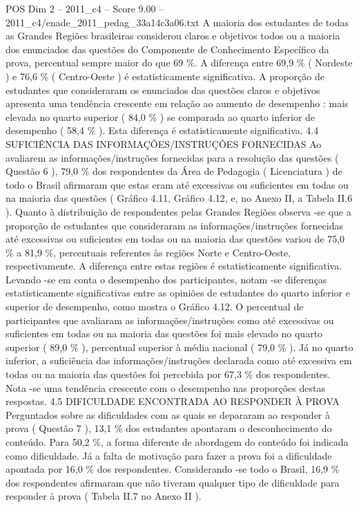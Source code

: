 \begin{textsample}{POS Dim 2 – 2011\_c4 – Score 9.00 – 2011\_c4/enade\_2011\_pedag\_33a14c3a06.txt}
A maioria dos estudantes de todas as Grandes Regiões brasileiras considerou claros e objetivos todos ou a maioria dos enunciados das questões do Componente de Conhecimento Específico da prova, percentual sempre maior do que 69 \%.
A diferença entre 69,9 \% ( Nordeste ) e 76,6 \% ( Centro-Oeste ) é estatisticamente significativa.
A proporção de estudantes que consideraram os enunciados das questões claros e objetivos apresenta uma tendência crescente em relação ao aumento de desempenho : mais elevada no quarto superior ( 84,0 \% ) se comparada ao quarto inferior de desempenho ( 58,4 \% ).
Esta diferença é estatisticamente significativa. 4.4 SUFICIÊNCIA DAS INFORMAÇÕES/INSTRUÇÕES FORNECIDAS Ao avaliarem as informações/instruções fornecidas para a resolução das questões ( Questão 6 ), 79,0 \% dos respondentes da Área de Pedagogia ( Licenciatura ) de todo o Brasil afirmaram que estas eram até excessivas ou suficientes em todas ou na maioria das questões ( Gráfico 4.11, Gráfico 4.12, e, no Anexo II, a Tabela II.6 ).
Quanto à distribuição de respondentes pelas Grandes Regiões observa -se que a proporção de estudantes que consideraram as informações/instruções fornecidas até excessivas ou suficientes em todas ou na maioria das questões variou de 75,0 \% a 81,9 \%, percentuais referentes às regiões Norte e Centro-Oeste, respectivamente.
A diferença entre estas regiões é estatisticamente significativa.
Levando -se em conta o desempenho dos participantes, notam -se diferenças estatisticamente significativas entre as opiniões de estudantes do quarto inferior e superior de desempenho, como mostra o Gráfico 4.12.
O percentual de participantes que avaliaram as informações/instruções como até excessivas ou suficientes em todas ou na maioria das questões foi mais elevado no quarto superior ( 89,0 \% ), percentual superior à média nacional ( 79,0 \% ).
Já no quarto inferior, a suficiência das informações/instruções declarada como até excessiva em todas ou na maioria das questões foi percebida por 67,3 \% dos respondentes.
Nota -se uma tendência crescente com o desempenho nas proporções destas respostas. 4.5 DIFICULDADE ENCONTRADA AO RESPONDER À PROVA Perguntados sobre as dificuldades com as quais se depararam ao responder à prova ( Questão 7 ), 13,1 \% dos estudantes apontaram o desconhecimento do conteúdo.
Para 50,2 \%, a forma diferente de abordagem do conteúdo foi indicada como dificuldade.
Já a falta de motivação para fazer a prova foi a dificuldade apontada por 16,0 \% dos respondentes.
Considerando -se todo o Brasil, 16,9 \% dos respondentes afirmaram que não tiveram qualquer tipo de dificuldade para responder à prova ( Tabela II.7 no Anexo II ).

\end{textsample}
